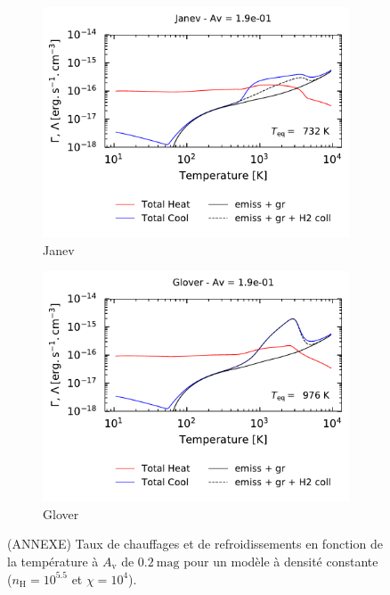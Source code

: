 \begin{figure}[!h]
\begin{subfigure}[t]{0.49\textwidth}
        \centering \includegraphics[trim = {0 0 0 1cm },clip,width=1\textwidth]{figure/H2/bosse_dcte_janevVSglover/janev/GC_c_1p9em01.pdf}
        \caption{Janev}
    \end{subfigure}
    \begin{subfigure}[t]{0.49\textwidth}
        \centering \includegraphics[trim = {0 0 0 1cm },clip,width=1\textwidth]{figure/H2/bosse_dcte_janevVSglover/glover/GC_c_1p9em01.pdf}
        \caption{Glover}
    \end{subfigure}
    \caption{(ANNEXE) Taux de chauffages et de refroidissements en fonction de la température à $A_\mathrm{v}$ de $0.2 \ \mathrm{mag}$ pour un modèle à densité constante ($n_\mathrm{H} = 10^{5.5}$ et $\chi = 10^4$).}
    \label{fig:H2:bosse:GC}
\end{figure}

